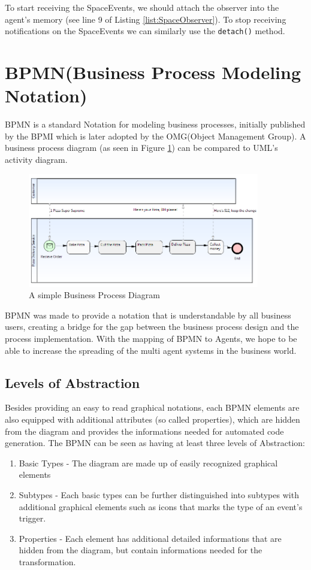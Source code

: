 To start receiving the SpaceEvents, we should attach the observer into the agent's memory (see line 9 of Listing \ref{list:SpaceObserver}). To stop receiving notifications on the SpaceEvents we can similarly use the \texttt{detach()} method.

\newpage
\section{BPMN(Business Process Modeling Notation)}
BPMN \cite{BPMN2} is a standard Notation for modeling business processes, initially published by the BPMI which is later adopted by the OMG(Object Management Group). A business process diagram (as seen in Figure \ref{fig:bpmn_sampl}) can be compared to UML's activity diagram.\\
\begin{figure}[h]
	\centering
		\includegraphics[width=0.90\textwidth]{images/bpmn_sampl.png}
	\caption{A simple Business Process Diagram}
	\label{fig:bpmn_sampl}
\end{figure}

BPMN was made to provide a notation that is understandable by all business users, creating a bridge for the gap between the business process design and the process implementation. With the mapping of BPMN to Agents, we hope to be able to increase the spreading of the multi agent systems in the business world.


\subsection{Levels of Abstraction}
Besides providing an easy to read graphical notations, each BPMN elements are also equipped with additional attributes (so called properties), which are hidden from the diagram and provides the informations needed for automated code generation. The BPMN can be seen as having at least three levels of Abstraction:
\begin{enumerate}
	\item Basic Types - The diagram are made up of easily recognized graphical elements
	\item Subtypes - Each basic types can be further distinguished into subtypes with additional graphical elements such as icons that marks the type of an event's trigger.
	\item Properties - Each element has additional detailed informations that are hidden from the diagram, but contain informations needed for the transformation.
\end{enumerate}


